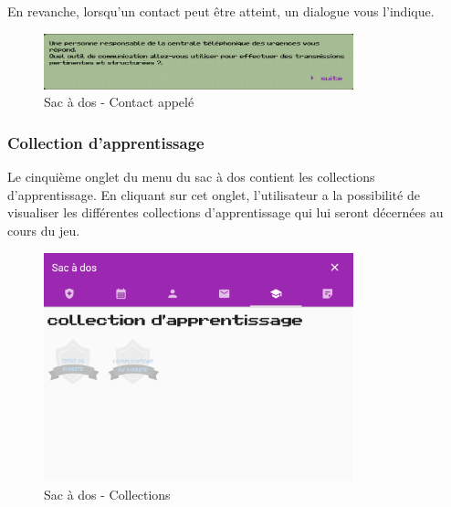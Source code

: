 En revanche, lorsqu'un contact peut être atteint, un dialogue vous l'indique.
\begin{figure}[H]
    \centering
    \includegraphics[width=0.8\textwidth ]{images/toolsMenu/contactCanBeUsed.png}
    \caption{Sac à dos - Contact appelé}
    \label{fig:pic_dessus}
\end{figure}


\subsubsection*{Collection d'apprentissage}

Le cinquième onglet du menu du sac à dos contient les collections d'apprentissage. En cliquant sur cet onglet, l'utilisateur a la possibilité de visualiser les différentes collections d'apprentissage qui lui seront décernées au cours du jeu. \\

\begin{figure}[H]
    \centering
    \includegraphics[width=0.8\textwidth ]{images/toolsMenu/collections.png}
    \caption{Sac à dos - Collections}
    \label{fig:pic_dessus}
\end{figure}


